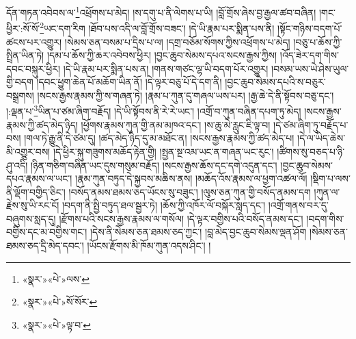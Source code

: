 \documentclass[12pt,a4paper]{book}
\begin{document}
དོན་གཏན་འབེབས་ལ་\footnote{«སྣར་»«པེ་»ལས་}འཕྲོགས་པ་མེད། །ས་དགུ་པ་ནི་ལེགས་པ་ཡི། །བློ་གྲོས་ཞེས་བྱ་རྒྱལ་ཚབ་བཞིན། །གང་ཕྱིར་:སོ་སོ་\footnote{«སྣར་»«པེ་»སོ་སོར་}ཡང་དག་རིག །ཐོབ་པས་འདི་ལ་བློ་གྲོས་བཟང་། །དེ་ཡི་རྣམ་པར་སྨིན་པས་ནི། །སྟོང་གཉིས་བདག་པོ་ཚངས་པར་འགྱུར། །སེམས་ཅན་བསམ་པ་དྲིས་པ་ལ། །དགྲ་བཅོམ་སོགས་ཀྱིས་འཕྲོགས་པ་མེད། །བཅུ་པ་ཆོས་ཀྱི་སྤྲིན་ཡིན་ཏེ། །དམ་པ་ཆོས་ཀྱི་ཆར་འབེབས་ཕྱིར། །བྱང་ཆུབ་སེམས་དཔའ་སངས་རྒྱས་ཀྱིས། །འོད་ཟེར་དག་གིས་དབང་བསྐུར་ཕྱིར། །དེ་ཡི་རྣམ་པར་སྨིན་པས་ན། །གནས་གཙང་ལྷ་ཡི་བདག་པོར་འགྱུར། །བསམ་ཡས་ཡེ་ཤེས་ཡུལ་གྱི་བདག །དབང་ཕྱུག་ཆེན་པོ་མཆོག་ཡིན་ནོ། །དེ་ལྟར་བཅུ་པོ་དེ་དག་ནི། །བྱང་ཆུབ་སེམས་དཔའི་ས་བཅུར་བསྒྲགས། །སངས་རྒྱས་རྣམས་ཀྱི་ས་གཞན་ཏེ། །རྣམ་པ་ཀུན་དུ་གཞལ་ཡས་པར། །རྒྱ་ཆེ་དེ་ནི་སྟོབས་བཅུ་དང་། །:ལྡན་པ་\footnote{«སྣར་»«པེ་»ལྟ་བ་}ཡིན་པ་ཙམ་ཞིག་བརྗོད། །དེ་ཡི་སྟོབས་ནི་རེ་རེ་ཡང་། །འགྲོ་བ་ཀུན་བཞིན་དཔག་ཏུ་མེད། །སངས་རྒྱས་རྣམས་ཀྱི་ཚད་མེད་ཉིད། །ཕྱོགས་རྣམས་ཀུན་གྱི་ནམ་མཁའ་དང་། །ས་ཆུ་མེ་རླུང་ཇི་ལྟ་བ། །དེ་ཙམ་ཞིག་ཏུ་བརྗོད་པ་བས། །གལ་ཏེ་རྒྱུ་ནི་དེ་ཙམ་དུ། །ཚད་མེད་ཉིད་དུ་མ་མཐོང་ན། །སངས་རྒྱས་རྣམས་ཀྱི་ཚད་མེད་པ། །དེ་ལ་ཡིད་ཆེས་མི་འགྱུར་བས། །དེ་ཕྱིར་སྐུ་གཟུགས་མཆོད་རྟེན་གྱི། །སྤྱན་སྔ་འམ་ཡང་ན་གཞན་ཡང་རུང་། །ཚིགས་སུ་བཅད་པ་ཉི་ཤུ་འདི། །ཉིན་གཅིག་བཞིན་ཡང་དུས་གསུམ་བརྗོད། །སངས་རྒྱས་ཆོས་དང་དགེ་འདུན་དང་། །བྱང་ཆུབ་སེམས་དཔའ་རྣམས་ལ་ཡང་། །རྣམ་ཀུན་བཏུད་དེ་སྐྱབས་མཆིས་ནས། །མཆོད་འོས་རྣམས་ལ་ཕྱག་འཚལ་ལོ། །སྡིག་པ་ལས་ནི་ལྡོག་བགྱིད་ཅིང་། །བསོད་ནམས་ཐམས་ཅད་ཡོངས་སུ་བཟུང་། །ལུས་ཅན་ཀུན་གྱི་བསོད་ནམས་དག །ཀུན་ལ་རྗེས་སུ་ཡི་རང་ངོ། །བདག་ནི་སྤྱི་བཏུད་ཐལ་སྦྱར་ཏེ། །ཆོས་ཀྱི་འཁོར་ལོ་བསྐོར་སླད་དང་། །འགྲོ་གནས་བར་དུ་བཞུགས་སླད་དུ། །རྫོགས་པའི་སངས་རྒྱས་རྣམས་ལ་གསོལ། །དེ་ལྟར་བགྱིས་པའི་བསོད་ནམས་དང་། །བདག་གིས་བགྱིས་དང་མ་བགྱིས་གང་། །དེས་ནི་སེམས་ཅན་ཐམས་ཅད་ཀྱང་། །བླ་མེད་བྱང་ཆུབ་སེམས་ལྡན་ཤོག །སེམས་ཅན་ཐམས་ཅད་དྲི་མེད་དབང་། །ཡོངས་རྫོགས་མི་ཁོམ་ཀུན་འདས་ཤིང་། །
\end{document}
